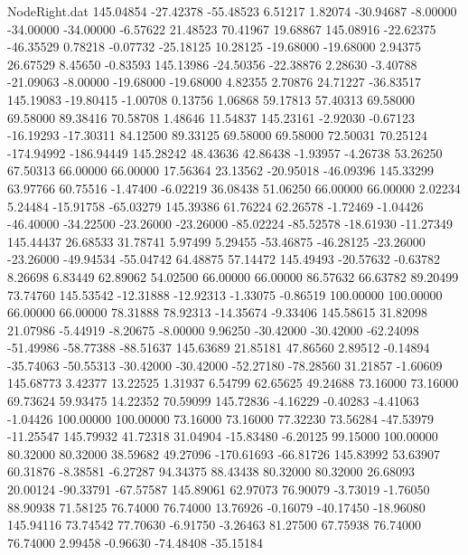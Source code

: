 \begin{filecontents}{NodeRight.dat}
 145.04854  -27.42378  -55.48523     6.51217    1.82074  -30.94687   -8.00000  -34.00000  -34.00000   -6.57622   21.48523   70.41967   19.68867
 145.08916  -22.62375  -46.35529     0.78218   -0.07732  -25.18125   10.28125  -19.68000  -19.68000    2.94375   26.67529    8.45650   -0.83593
 145.13986  -24.50356  -22.38876     2.28630   -3.40788  -21.09063   -8.00000  -19.68000  -19.68000    4.82355    2.70876   24.71227  -36.83517
 145.19083  -19.80415   -1.00708     0.13756    1.06868   59.17813   57.40313   69.58000   69.58000   89.38416   70.58708    1.48646   11.54837
 145.23161   -2.92030   -0.67123   -16.19293  -17.30311   84.12500   89.33125   69.58000   69.58000   72.50031   70.25124 -174.94992 -186.94449
 145.28242   48.43636   42.86438    -1.93957   -4.26738   53.26250   67.50313   66.00000   66.00000   17.56364   23.13562  -20.95018  -46.09396
 145.33299   63.97766   60.75516    -1.47400   -6.02219   36.08438   51.06250   66.00000   66.00000    2.02234    5.24484  -15.91758  -65.03279
 145.39386   61.76224   62.26578    -1.72469   -1.04426  -46.40000  -34.22500  -23.26000  -23.26000  -85.02224  -85.52578  -18.61930  -11.27349
 145.44437   26.68533   31.78741     5.97499    5.29455  -53.46875  -46.28125  -23.26000  -23.26000  -49.94534  -55.04742   64.48875   57.14472
 145.49493  -20.57632   -0.63782     8.26698    6.83449   62.89062   54.02500   66.00000   66.00000   86.57632   66.63782   89.20499   73.74760
 145.53542  -12.31888  -12.92313    -1.33075   -0.86519  100.00000  100.00000   66.00000   66.00000   78.31888   78.92313  -14.35674   -9.33406
 145.58615   31.82098   21.07986    -5.44919   -8.20675   -8.00000    9.96250  -30.42000  -30.42000  -62.24098  -51.49986  -58.77388  -88.51637
 145.63689   21.85181   47.86560     2.89512   -0.14894  -35.74063  -50.55313  -30.42000  -30.42000  -52.27180  -78.28560   31.21857   -1.60609
 145.68773    3.42377   13.22525     1.31937    6.54799   62.65625   49.24688   73.16000   73.16000   69.73624   59.93475   14.22352   70.59099
 145.72836   -4.16229   -0.40283    -4.41063   -1.04426  100.00000  100.00000   73.16000   73.16000   77.32230   73.56284  -47.53979  -11.25547
 145.79932   41.72318   31.04904   -15.83480   -6.20125   99.15000  100.00000   80.32000   80.32000   38.59682   49.27096 -170.61693  -66.81726
 145.83992   53.63907   60.31876    -8.38581   -6.27287   94.34375   88.43438   80.32000   80.32000   26.68093   20.00124  -90.33791  -67.57587
 145.89061   62.97073   76.90079    -3.73019   -1.76050   88.90938   71.58125   76.74000   76.74000   13.76926   -0.16079  -40.17450  -18.96080
 145.94116   73.74542   77.70630    -6.91750   -3.26463   81.27500   67.75938   76.74000   76.74000    2.99458   -0.96630  -74.48408  -35.15184

\end{filecontents}
